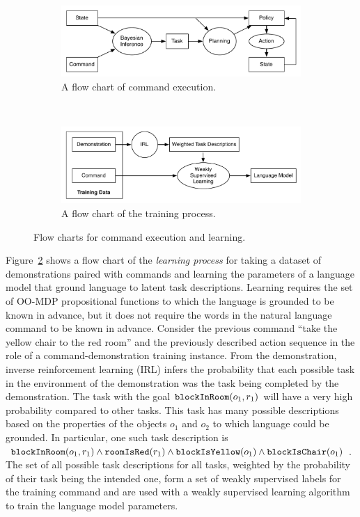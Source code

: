 \documentclass[conference]{IEEEtran}
\begin{document}
\begin{figure}
        \centering
        \begin{subfigure}[b]{\columnwidth}
                \includegraphics[width=\textwidth]{images/executeFlow}
                \caption{\small A flow chart of command execution.}
                \label{fig:execute}
        \end{subfigure}%
        \\
        \begin{subfigure}[b]{\columnwidth}
                \includegraphics[width=\textwidth]{images/trainFlow}
                \caption{\small A flow chart of the training process.}
                \label{fig:learn}
        \end{subfigure}
        \caption{\small Flow charts for command execution and learning.}\label{fig:flow}
\end{figure}

Figure~\ref{fig:learn} shows a flow chart of the \emph{learning process} for taking a dataset of demonstrations paired with commands and learning the parameters of a language model that ground language to latent task descriptions. Learning requires the set of OO-MDP propositional functions to which the language is grounded to be known in advance, but it does not require the words in the natural language command to be known in advance. Consider the previous command ``take the yellow chair to the red room'' and the previously described action sequence in the role of a command-demonstration training instance. From the demonstration, inverse reinforcement learning (IRL) infers the probability that each possible task in the environment of the demonstration was the task being completed by the demonstration. The task with the goal ${\tt blockInRoom}(o_1, r_1)$ will have a very high probability compared to other tasks. This task has many possible descriptions based on the properties of the objects $o_1$ and $o_2$ to which language could be grounded. In particular, one such task description is ${\tt blockInRoom}(o_1, r_1) \land {\tt roomIsRed}(r_1) \land {\tt blockIsYellow}(o_1) \land {\tt blockIsChair}(o_1)$. The set of all possible task descriptions for all tasks, weighted by the probability of their task being the intended one, form a set of weakly supervised labels for the training command and are used with a weakly supervised learning algorithm to train the language model parameters.
\end{document}
